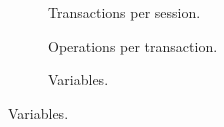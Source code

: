 \begin{figure}
\begin{subfigure}{.33\textwidth}
{  }
  \caption{Transactions per session.}
  \label{ser_transaction_scale}
 \end{subfigure}
 \hspace{-2mm}
 \begin{subfigure}{.33\textwidth}
  \caption{Operations per transaction.}
  \label{ser_operation_scale}
 \end{subfigure}
 \hspace{-3mm}
 \begin{subfigure}{.33\textwidth}
  \caption{Variables.}

\end{subfigure}
\end{figure}
